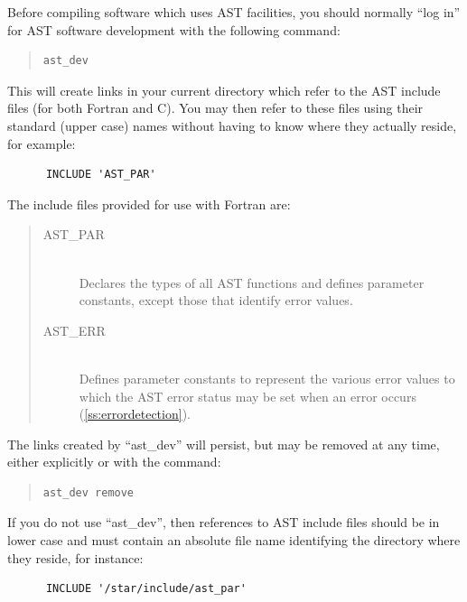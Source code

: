 \documentclass[twoside,11pt]{article}
\newcommand{\htmlref}[2]{#1}
\newcommand{\secref}[1]{\S\ref{#1}}
\renewcommand{\secref}[1]{\ref{#1}}
\begin{document}
Before compiling software which uses AST facilities, you should
normally ``log in'' for AST software development with the following
command:

\begin{quote}
\small
\begin{verbatim}
ast_dev
\end{verbatim}
\normalsize
\end{quote}

This will create links in your current directory which refer to the
AST include files (for both Fortran and C).
You may then refer to these files using their standard (upper case)
names without having to know where they actually reside, for example:

\small
\begin{verbatim}
      INCLUDE 'AST_PAR'
\end{verbatim}
\normalsize

The include files provided for use with Fortran are:

\begin{quote}
\begin{description}
\item[AST\_PAR]\mbox{}\\
Declares the types of all AST functions and defines parameter
constants, except those that identify error values.

\item[AST\_ERR]\mbox{}\\
Defines parameter constants to represent the various error values to
which the AST error status may be set when an error occurs
(\secref{ss:errordetection}).
\end{description}
\end{quote}
The links created by ``\htmlref{ast\_dev}{ast_dev}'' will persist, but may be removed at
any time, either explicitly or with the command:

\begin{quote}
\small
\begin{verbatim}
ast_dev remove
\end{verbatim}
\normalsize
\end{quote}

If you do not use ``ast\_dev'', then references to AST include files
should be in lower case and must contain an absolute file name
identifying the directory where they reside, for instance:

\small
\begin{verbatim}
      INCLUDE '/star/include/ast_par'
\end{verbatim}
\normalsize
\end{document}

